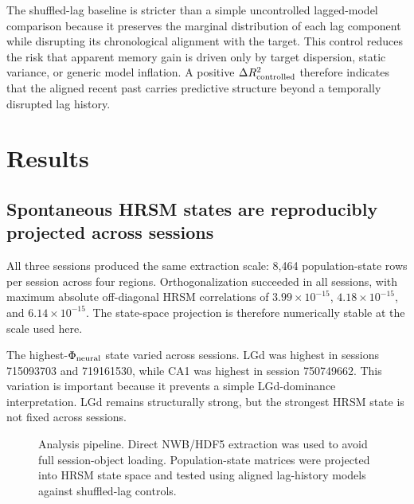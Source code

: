 \documentclass[11pt]{article}
\begin{document}
The shuffled-lag baseline is stricter than a simple uncontrolled lagged-model comparison because it preserves the marginal distribution of each lag component while disrupting its chronological alignment with the target. This control reduces the risk that apparent memory gain is driven only by target dispersion, static variance, or generic model inflation. A positive \(\Delta R^2_{\rm controlled}\) therefore indicates that the aligned recent past carries predictive structure beyond a temporally disrupted lag history.

\section{Results}

\subsection{Spontaneous HRSM states are reproducibly projected across sessions}

All three sessions produced the same extraction scale: 8,464 population-state rows per session across four regions. Orthogonalization succeeded in all sessions, with maximum absolute off-diagonal HRSM correlations of \(3.99 \times 10^{-15}\), \(4.18 \times 10^{-15}\), and \(6.14 \times 10^{-15}\). The state-space projection is therefore numerically stable at the scale used here.

The highest-\(\Phi_{\rm neural}\) state varied across sessions. LGd was highest in sessions 715093703 and 719161530, while CA1 was highest in session 750749662. This variation is important because it prevents a simple LGd-dominance interpretation. LGd remains structurally strong, but the strongest HRSM state is not fixed across sessions.

\begin{figure}[t]
\centering
{}
\caption{Analysis pipeline. Direct NWB/HDF5 extraction was used to avoid full session-object loading. Population-state matrices were projected into HRSM state space and tested using aligned lag-history models against shuffled-lag controls.}
\label{fig:pipeline}
\end{figure}
\end{document}
